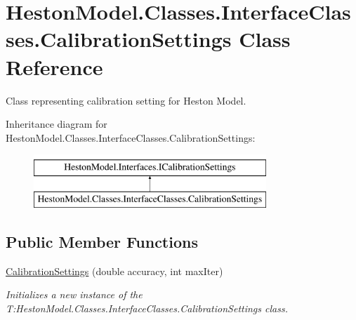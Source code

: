 \hypertarget{class_heston_model_1_1_classes_1_1_interface_classes_1_1_calibration_settings}{}\section{Heston\+Model.\+Classes.\+Interface\+Classes.\+Calibration\+Settings Class Reference}
\label{class_heston_model_1_1_classes_1_1_interface_classes_1_1_calibration_settings}


Class representing calibration setting for Heston Model.  


Inheritance diagram for Heston\+Model.\+Classes.\+Interface\+Classes.\+Calibration\+Settings\+:\begin{figure}[H]
\begin{center}
\leavevmode
\includegraphics[height=2.000000cm]{class_heston_model_1_1_classes_1_1_interface_classes_1_1_calibration_settings}
\end{center}
\end{figure}
\subsection*{Public Member Functions}
\begin{DoxyCompactItemize}
\item 
\mbox{\hyperlink{class_heston_model_1_1_classes_1_1_interface_classes_1_1_calibration_settings_aade4360f075f355f3847a4f13baf2431}{Calibration\+Settings}} (double accuracy, int max\+Iter)
\begin{DoxyCompactList}\small\item\em Initializes a new instance of the T\+:\+Heston\+Model.\+Classes.\+Interface\+Classes.\+Calibration\+Settings class. \end{DoxyCompactList}\end{DoxyCompactItemize}
